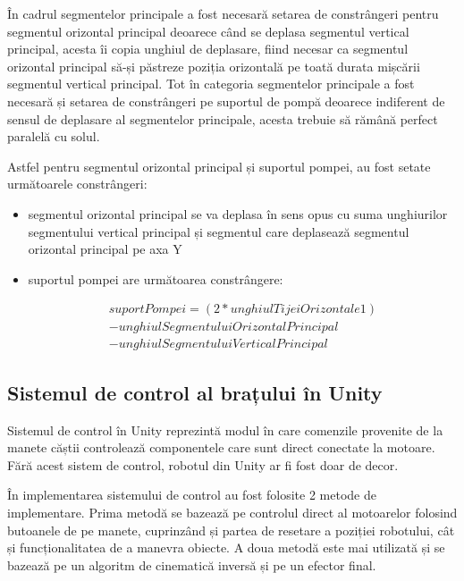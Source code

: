 În cadrul segmentelor principale a fost necesară setarea de constrângeri pentru segmentul orizontal principal deoarece când se deplasa segmentul vertical principal, acesta îi copia unghiul de deplasare, fiind necesar ca segmentul orizontal principal să-și păstreze poziția orizontală pe toată durata mișcării segmentul vertical principal. 
Tot în categoria segmentelor principale a fost necesară și setarea de constrângeri pe suportul de pompă deoarece indiferent de sensul de deplasare al segmentelor principale, acesta trebuie să rămână perfect paralelă cu solul.

Astfel pentru segmentul orizontal principal și suportul pompei, au fost setate următoarele constrângeri:
\begin{itemize}
	\item segmentul orizontal principal se va deplasa în sens opus cu suma unghiurilor segmentului vertical principal și segmentul care deplasează  segmentul orizontal principal pe axa Y
	\item suportul pompei are următoarea constrângere: 
	
	\begin{equation*}
			\begin{split}
				suportPompei = (2 * unghiulTijeiOrizontale1)  \\
				-unghiulSegmentuluiOrizontalPrincipal \\
				-unghiulSegmentuluiVerticalPrincipal
			\end{split}
	\end{equation*}

\end{itemize}


\subsection{Sistemul de control al brațului în Unity}
Sistemul de control în Unity reprezintă modul în care comenzile provenite de la manete căștii controlează componentele care sunt direct conectate la motoare. Fără acest sistem de control, robotul din Unity ar fi fost doar de decor.

În implementarea sistemului de control au fost folosite 2 metode de implementare. Prima metodă se bazează pe controlul direct al motoarelor folosind butoanele de pe manete, cuprinzând și partea de resetare a poziției robotului, cât și funcționalitatea de a manevra obiecte. A doua metodă este mai utilizată și se bazează pe un algoritm de cinematică inversă și pe un efector final.

